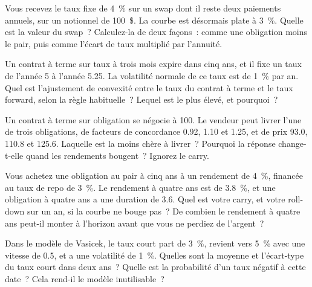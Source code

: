 \begin{question}\label{iq:iv2:rates-and-fx:20}
Vous recevez le taux fixe de 4~\% sur un swap dont il reste deux paiements annuels, sur un notionnel de 100~\$. La courbe est désormais plate à 3~\%. Quelle est la valeur du swap~? Calculez-la de deux façons~: comme une obligation moins le pair, puis comme l'écart de taux multiplié par l'annuité.
\end{question}

\begin{question}\label{iq:iv2:rates-and-fx:21}
Un contrat à terme sur taux à trois mois expire dans cinq ans, et il fixe un taux de l'année 5 à l'année 5.25. La volatilité normale de ce taux est de 1~\% par an. Quel est l'ajustement de convexité entre le taux du contrat à terme et le taux forward, selon la règle habituelle~? Lequel est le plus élevé, et pourquoi~?
\end{question}

\begin{question}\label{iq:iv2:rates-and-fx:22}
Un contrat à terme sur obligation se négocie à 100. Le vendeur peut livrer l'une de trois obligations, de facteurs de concordance 0.92, 1.10 et 1.25, et de prix 93.0, 110.8 et 125.6. Laquelle est la moins chère à livrer~? Pourquoi la réponse change-t-elle quand les rendements bougent~? Ignorez le carry.
\end{question}

\begin{question}\label{iq:iv2:rates-and-fx:23}
Vous achetez une obligation au pair à cinq ans à un rendement de 4~\%, financée au taux de repo de 3~\%. Le rendement à quatre ans est de 3.8~\%, et une obligation à quatre ans a une duration de 3.6. Quel est votre carry, et votre roll-down sur un an, si la courbe ne bouge pas~? De combien le rendement à quatre ans peut-il monter à l'horizon avant que vous ne perdiez de l'argent~?
\end{question}

\begin{question}\label{iq:iv2:rates-and-fx:24}
Dans le modèle de Vasicek, le taux court part de 3~\%, revient vers 5~\% avec une vitesse de 0.5, et a une volatilité de 1~\%. Quelles sont la moyenne et l'écart-type du taux court dans deux ans~? Quelle est la probabilité d'un taux négatif à cette date~? Cela rend-il le modèle inutilisable~?
\end{question}

